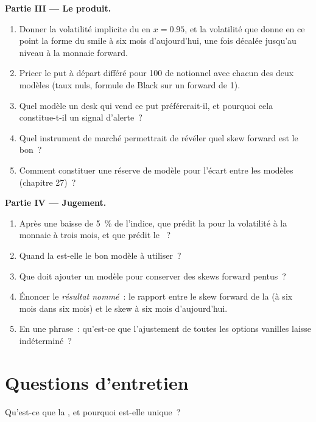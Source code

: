 \begin{problem}
\medskip\noindent\textbf{Partie III --- Le produit.}
\begin{enumerate}[resume]
\item Donner la volatilité implicite du  en $x=0.95$, et la volatilité que donne en ce point la forme du smile
à six mois d'aujourd'hui, une fois décalée jusqu'au niveau à la monnaie forward.
\item Pricer le put à départ différé pour 100 de notionnel avec chacun des deux modèles (taux nuls, formule de Black sur un forward de 1).
\item Quel modèle un desk qui vend ce put préférerait-il, et pourquoi cela constitue-t-il un signal d'alerte~?
\item Quel instrument de marché permettrait de révéler quel skew forward est le bon~?
\item Comment constituer une réserve de modèle pour l'écart entre les modèles (chapitre 27)~?
\end{enumerate}

\medskip\noindent\textbf{Partie IV --- Jugement.}
\begin{enumerate}[resume]
\item Après une baisse de 5~\% de l'indice, que prédit la  pour la volatilité à la monnaie à trois mois,
et que prédit le ~?
\item Quand la  est-elle le bon modèle à utiliser~?
\item Que doit ajouter un modèle pour conserver des skews forward pentus~?
\item Énoncer le \emph{résultat nommé}~: le rapport entre le skew forward de la  (à six mois dans six mois) et
le skew à six mois d'aujourd'hui.
\item En une phrase~: qu'est-ce que l'ajustement de toutes les options vanilles laisse indéterminé~?
\end{enumerate}
\end{problem}

\section{Questions d'entretien}

\begin{interviewq}\label{iq:dv:local-volatility:1}
Qu'est-ce que la , et pourquoi est-elle unique~?
\end{interviewq}

